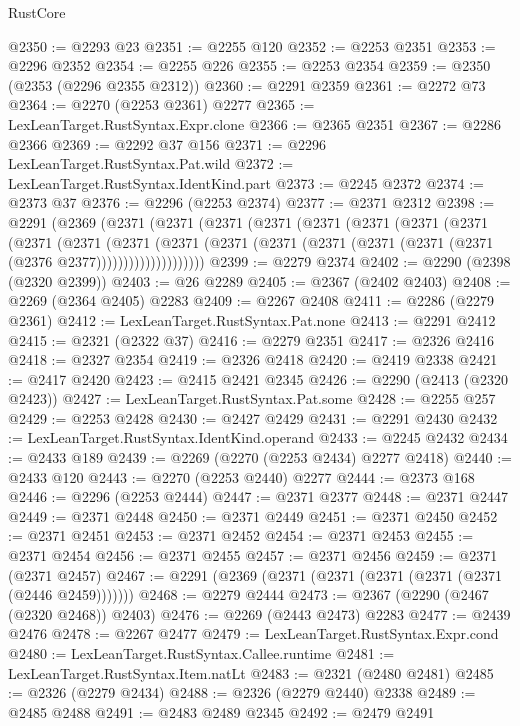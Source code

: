 \begin{lexlean}{RustCore}
\begin{coremodule}
@2350 := @2293 @23
@2351 := @2255 @120
@2352 := @2253 @2351
@2353 := @2296 @2352
@2354 := @2255 @226
@2355 := @2253 @2354
@2359 := @2350 (@2353 (@2296 @2355 @2312))
@2360 := @2291 @2359
@2361 := @2272 @73
@2364 := @2270 (@2253 @2361) @2277
@2365 := LexLeanTarget.RustSyntax.Expr.clone
@2366 := @2365 @2351
@2367 := @2286 @2366
@2369 := @2292 @37 @156
@2371 := @2296 LexLeanTarget.RustSyntax.Pat.wild
@2372 := LexLeanTarget.RustSyntax.IdentKind.part
@2373 := @2245 @2372
@2374 := @2373 @37
@2376 := @2296 (@2253 @2374)
@2377 := @2371 @2312
@2398 := @2291
    (@2369
      (@2371
        (@2371
          (@2371
            (@2371
              (@2371
                (@2371
                  (@2371
                    (@2371
                      (@2371
                        (@2371
                          (@2371
                            (@2371
                              (@2371
                                (@2371 (@2371 (@2371 (@2371 (@2371 (@2376 @2377))))))))))))))))))))
@2399 := @2279 @2374
@2402 := @2290 (@2398 (@2320 @2399))
@2403 := @26 @2289
@2405 := @2367 (@2402 @2403)
@2408 := @2269 (@2364 @2405) @2283
@2409 := @2267 @2408
@2411 := @2286 (@2279 @2361)
@2412 := LexLeanTarget.RustSyntax.Pat.none
@2413 := @2291 @2412
@2415 := @2321 (@2322 @37)
@2416 := @2279 @2351
@2417 := @2326 @2416
@2418 := @2327 @2354
@2419 := @2326 @2418
@2420 := @2419 @2338
@2421 := @2417 @2420
@2423 := @2415 @2421 @2345
@2426 := @2290 (@2413 (@2320 @2423))
@2427 := LexLeanTarget.RustSyntax.Pat.some
@2428 := @2255 @257
@2429 := @2253 @2428
@2430 := @2427 @2429
@2431 := @2291 @2430
@2432 := LexLeanTarget.RustSyntax.IdentKind.operand
@2433 := @2245 @2432
@2434 := @2433 @189
@2439 := @2269 (@2270 (@2253 @2434) @2277 @2418)
@2440 := @2433 @120
@2443 := @2270 (@2253 @2440) @2277
@2444 := @2373 @168
@2446 := @2296 (@2253 @2444)
@2447 := @2371 @2377
@2448 := @2371 @2447
@2449 := @2371 @2448
@2450 := @2371 @2449
@2451 := @2371 @2450
@2452 := @2371 @2451
@2453 := @2371 @2452
@2454 := @2371 @2453
@2455 := @2371 @2454
@2456 := @2371 @2455
@2457 := @2371 @2456
@2459 := @2371 (@2371 @2457)
@2467 := @2291 (@2369 (@2371 (@2371 (@2371 (@2371 (@2371 (@2446 @2459)))))))
@2468 := @2279 @2444
@2473 := @2367 (@2290 (@2467 (@2320 @2468)) @2403)
@2476 := @2269 (@2443 @2473) @2283
@2477 := @2439 @2476
@2478 := @2267 @2477
@2479 := LexLeanTarget.RustSyntax.Expr.cond
@2480 := LexLeanTarget.RustSyntax.Callee.runtime
@2481 := LexLeanTarget.RustSyntax.Item.natLt
@2483 := @2321 (@2480 @2481)
@2485 := @2326 (@2279 @2434)
@2488 := @2326 (@2279 @2440) @2338
@2489 := @2485 @2488
@2491 := @2483 @2489 @2345
@2492 := @2479 @2491

\end{coremodule}
\end{lexlean}
